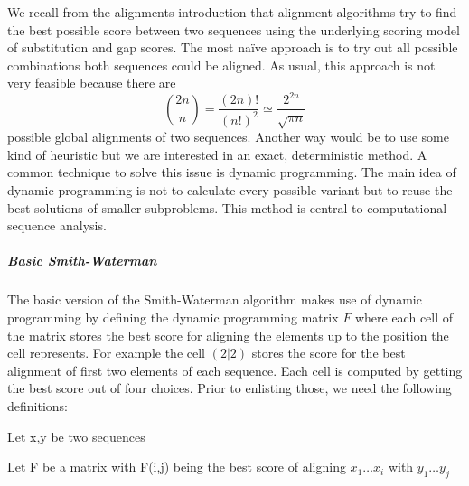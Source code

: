 We recall from the alignments introduction that alignment algorithms try to find the best possible score between two sequences using the underlying scoring model of substitution and gap scores.
The most na\"ive approach is to try out all possible combinations both sequences could be aligned. As usual, this approach is not very feasible because there are 
\begin{equation*}
	\binom{2n}{n} = \frac{(2n)!}{(n!)^2} \simeq \frac{2^{2n}}{\sqrt{\pi n}}
\end{equation*}
possible global alignments of two sequences\cite{durbin1998}. 
Another way would be to use some kind of heuristic but we are interested in an exact, deterministic method.
A common technique to solve this issue is dynamic programming\cite{bellman1957}. 
The main idea of dynamic programming is not to calculate every possible variant but to reuse the best solutions of smaller subproblems.  This method is central to computational sequence analysis\cite{durbin1998}.

\subparagraph{Basic Smith-Waterman}
The basic version of the Smith-Waterman algorithm makes use of dynamic programming by defining the dynamic programming matrix $F$ where each cell of the matrix stores the best score for aligning the elements up to the position the cell represents.
For example the cell $(2|2)$ stores the score for the best alignment of first two elements of each sequence. 
Each cell is computed by getting the best score out of four choices. Prior to enlisting those, we need the following definitions: 

\begin{definition}
	\item Let x,y be two sequences
	\item Let F be a matrix with F(i,j) being the best score of aligning $x_1\dots x_i$ with $y_1\dots y_j$
\end{definition}

